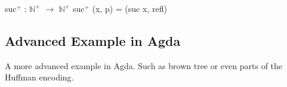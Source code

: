 \begin{codesnippet}[mathescape=true, caption={Successor of $\mathbb{N}^+$}, label={codeSnippet:nonzero_natural_number_suc}]
suc$^+$ : $\mathbb{N}^+$ $\rightarrow$ $\mathbb{N}^+$
suc$^+$ (x, p) = (suc x, refl)
\end{codesnippet}

\subsection{Advanced Example in Agda}
A more advanced example in Agda. Such as brown tree or even parts of the Huffman encoding.